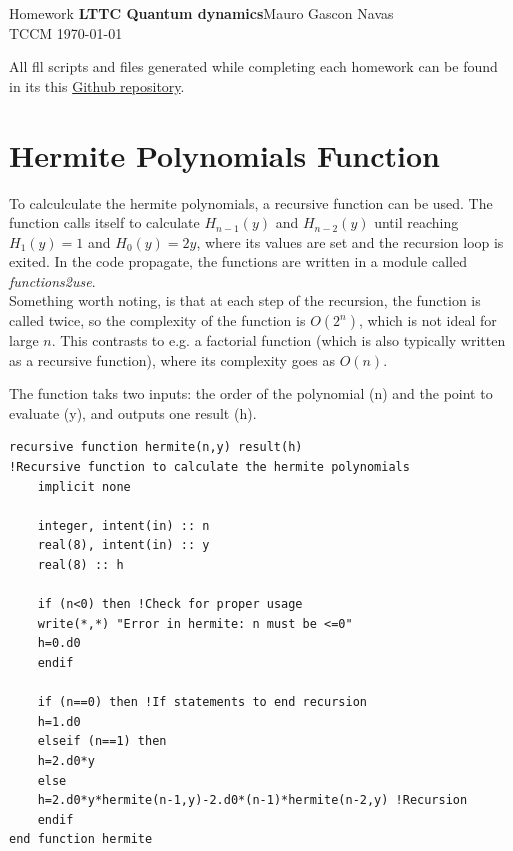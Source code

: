 \documentclass{cis320}
\begin{document}
\noindent Homework \textbf{LTTC Quantum dynamics}\hfill  Mauro Gascon Navas\\
TCCM \today

\hrulefill
\par
\vspace{1cm} 
All fll scripts and files generated while completing each homework can be found in its this \textcolor{blue}{\href{https://github.com/EliteSushi/LTTC2025/tree/main/Quantum_Dynamics}{Github repository}}.

\section{Hermite Polynomials Function}

To calculculate the hermite polynomials, a recursive function can be used. The function calls itself to calculate $H_{n-1}(y)$ and $H_{n-2}(y)$ until reaching $H_1(y)=1$ and $H_0(y)=2y$, where its values are set and the recursion loop is exited. In the code propagate, the functions are written in a module called \textit{functions2use}.\\
Something worth noting, is that at each step of the recursion, the function is called twice, so the complexity of the function is $O(2^n)$, which is not ideal for large $n$. This contrasts to e.g. a factorial function (which is also typically written as a recursive function), where its complexity goes as $O(n)$.\\
\par 
The function taks two inputs: the order of the polynomial (n) and the point to evaluate (y), and outputs one result (h).
    \begin{lstlisting}[caption=Recursive function to calculate hermite polynomials]
recursive function hermite(n,y) result(h) 
!Recursive function to calculate the hermite polynomials
    implicit none

    integer, intent(in) :: n
    real(8), intent(in) :: y
    real(8) :: h

    if (n<0) then !Check for proper usage
    write(*,*) "Error in hermite: n must be <=0"
    h=0.d0
    endif

    if (n==0) then !If statements to end recursion
    h=1.d0
    elseif (n==1) then
    h=2.d0*y
    else
    h=2.d0*y*hermite(n-1,y)-2.d0*(n-1)*hermite(n-2,y) !Recursion
    endif
end function hermite \end{lstlisting}
\end{document}
